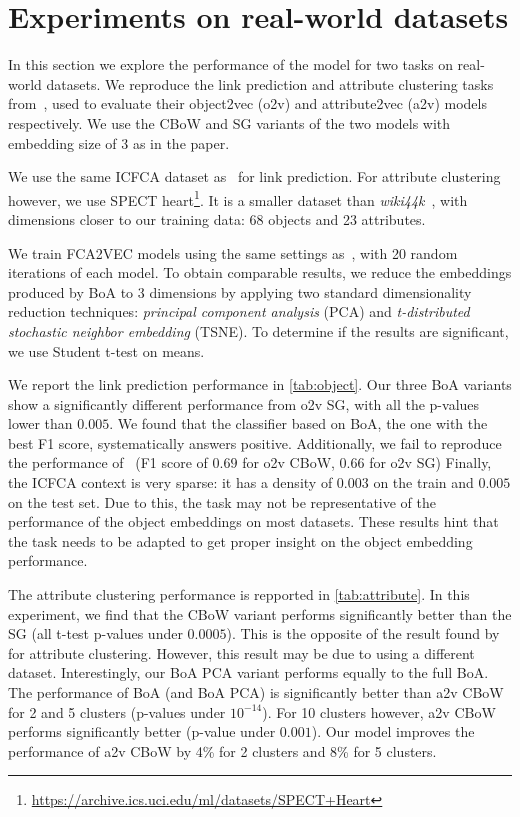 \section{Experiments on real-world datasets}\label{seq:experiments}
In this section we explore the performance of the model for two tasks on real-world datasets.
We reproduce the link prediction and attribute clustering tasks from~\cite{fca2vec:2019:durrschnabel}, used to evaluate their object2vec (o2v) and attribute2vec (a2v) models respectively.
We use the CBoW and SG variants of the two models with embedding size of 3 as in the paper.

We use the same ICFCA dataset as~\cite{fca2vec:2019:durrschnabel} for link prediction.
For attribute clustering however, we use SPECT heart\footnote{\url{https://archive.ics.uci.edu/ml/datasets/SPECT+Heart}}.
It is a smaller dataset than \textit{wiki44k}~\cite{fca2vec:2019:durrschnabel}, with dimensions closer to our training data: 68 objects and 23 attributes.

We train FCA2VEC models using the same settings as~\cite{fca2vec:2019:durrschnabel}, with 20 random iterations of each model.
To obtain comparable results, we reduce the embeddings produced by BoA to 3 dimensions by applying two standard dimensionality reduction techniques:
\textit{principal component analysis} (PCA) and \textit{t-distributed stochastic neighbor embedding} (TSNE).
To determine if the results are significant, we use Student t-test on means.


We report the link prediction performance in \autoref{tab:object}.
Our three BoA variants show a significantly different performance from o2v SG, with all the p-values lower than $0.005$.
%
We found that the classifier based on BoA, the one with the best F1 score, systematically answers positive.
Additionally, we fail to reproduce the performance of~\cite{fca2vec:2019:durrschnabel} (F1 score of $0.69$ for o2v CBoW, $0.66$ for o2v SG)
Finally, the ICFCA context is very sparse: it has a density of $0.003$ on the train and $0.005$ on the test set.
Due to this, the task may not be representative of the performance of the object embeddings on most datasets.
%
These results hint that the task needs to be adapted to get proper insight on the object embedding performance.


The attribute clustering performance is repported in \autoref{tab:attribute}.
In this experiment, we find that the CBoW variant performs significantly better than the SG (all t-test p-values under $0.0005$).
This is the opposite of the result found by~\cite{fca2vec:2019:durrschnabel} for attribute clustering.
However, this result may be due to using a different dataset.
Interestingly, our BoA PCA variant performs equally to the full BoA.
The performance of BoA (and BoA PCA) is significantly better than a2v CBoW for 2 and 5 clusters (p-values under $10^{-14}$).
For 10 clusters however, a2v CBoW performs significantly better (p-value under $0.001$).
%
Our model improves the performance of a2v CBoW by 4\% for 2 clusters and 8\% for 5 clusters.



